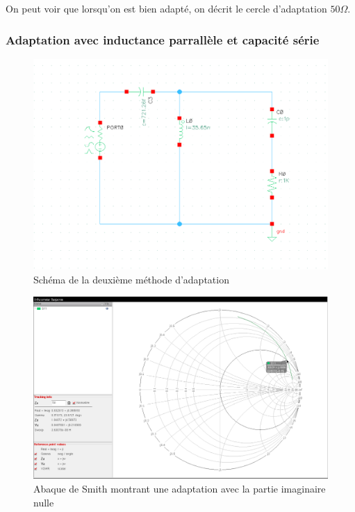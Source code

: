 \documentclass[a4paper]{article}
\begin{document}
On peut voir que lorsqu'on est bien adapt\'e, on d\'ecrit le cercle d'adaptation $50 \Omega$.

\subsubsection{Adaptation avec inductance parrall\`ele et capacit\'e s\'erie}

\begin{figure}[!htb]
\begin{center}
  \includegraphics[scale=0.47]{architecture-Lparalle-Cseries.png}
  \caption{Sch\'ema de la deuxi\`eme m\'ethode d'adaptation}
\end{center}
\end{figure}

\clearpage

\begin{figure}[!htb]
\begin{center}
  \includegraphics[width=\linewidth]{smith-induct-parallele-2nd-adapt.png}
  \caption{Abaque de Smith montrant une adaptation avec la partie imaginaire nulle}
\end{center}
\end{figure}
\end{document}
